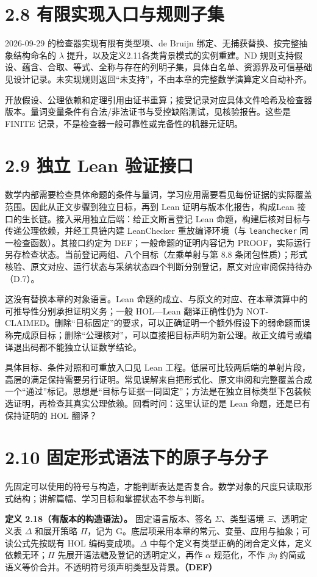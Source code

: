 \documentclass[UTF8,a4paper,zihao=-4,fontset=windows,openany]{ctexbook}
\begin{document}
\section{2.8 有限实现入口与规则子集}
2026-09-29 的检查器实现有限有类型项、de Bruijn 绑定、无捕获替换、按完整抽象结构命名的 \(\lambda\) 提升，以及定义2.11各类背景模式的实例重建。ND 规则支持假设、蕴含、合取、等式、全称与存在的列明子集，具体白名单、资源界及可信基础见设计记录。未实现规则返回“未支持”，不由本章的完整数学演算定义自动补齐。

开放假设、公理依赖和定理引用由证书重算；接受记录对应具体文件哈希及检查器版本。量词变量条件有合法/非法证书与受控缺陷测试，见核验报告。这些是 FINITE 记录，不是检查器一般可靠性或完备性的机器元证明。

\section{2.9 独立 Lean 验证接口}
数学内部需要检查具体命题的条件与量词，学习应用需要看见每份证据的实际覆盖范围。因此从正文步骤到独立目标，再到 Lean 证明与版本化报告，构成Lean 接口的生长链。接入采用独立后端：给正文断言登记 Lean 命题，构建后核对目标与传递公理依赖，并经工具链内建 LeanChecker 重放编译环境（与 \texttt{leanchecker} 同一检查函数）。其接口约定为 DEF；一般命题的证明内容记为 PROOF，实际运行另存检查状态。当前登记两组、八个目标（左乘单射与第 8.8 条闭包性质）；形式核验、原文对应、运行状态与采纳状态四个判断分别登记，原文对应审阅保持待办（D.7）。

这没有替换本章的对象语言。Lean 命题的成立、与原文的对应、在本章演算中的可推导性分别承担证明义务；一般 HOL—Lean 翻译正确性仍为 NOT-CLAIMED。删除“目标固定”的要求，可以正确证明一个额外假设下的弱命题而误称完成原目标；删除“公理核对”，可以直接把目标声明为新公理。故正文编号或编译退出码都不能独立认证数学结论。

具体目标、条件对照和可重放入口见 Lean 工程。低层可比较两后端的单射片段，高层的满足保持需要另行证明。常见误解来自把形式化、原文审阅和完整覆盖合成一个“通过”标记。思想是“目标与证据一同固定”；方法是在独立目标类型下包装候选证明，再检查其真实公理依赖。回看时问：这里认证的是 Lean 命题，还是已有保持证明的 HOL 翻译？

\section{2.10 固定形式语法下的原子与分子}
先固定可以使用的符号与构造，才能判断表达是否复合。数学对象的尺度只读取形式结构；讲解篇幅、学习目标和掌握状态不参与判断。

\textbf{定义 2.18（有版本的构造语法）。} 固定语言版本、签名 \(\Sigma\)、类型语境 \(\Xi\)、透明定义表 \(\Delta\) 和展开策略 \(\Pi\)，记为 G。底层项采用本章的常元、变量、应用与抽象；可读公式先按既有 HOL 编码变成项。\(\Delta\) 中每个定义有类型正确的闭合定义体，定义依赖无环；\(\Pi\) 先展开语法糖及登记的透明定义，再作 \(\alpha\) 规范化，不作 \(\beta\eta\) 约简或语义等价合并。不透明符号须声明类型及背景。\textbf{（DEF）}
\end{document}
